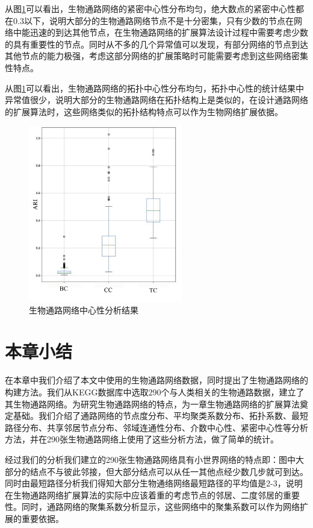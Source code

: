 从图\ref{fig29}可以看出，生物通路网络的紧密中心性分布均匀，绝大数点的紧密中心性都在0.3以下，说明大部分的生物通路网络节点不是十分密集，只有少数的节点在网络中能迅速的到达其他节点，在生物通路网络的扩展算法设计过程中需要考虑少数的具有重要性的节点。同时从不多的几个异常值可以发现，有部分网络的节点到达其他节点的能力极强，考虑这部分网络的扩展策略时可能需要考虑到这些网络密集性特点。

从图\ref{fig29}可以看出，生物通路网络的拓扑中心性分布均匀，拓扑中心性的统计结果中异常值很少，说明大部分的生物通路网络在拓扑结构上是类似的，在设计通路网络的扩展算法时，这些网络类似的拓扑结构特点可以作为生物网络扩展依据。

\begin{figure}[h]
\centering
\includegraphics[width = 0.6\textwidth]{center_summary}
\caption[fig29]{生物通路网络中心性分析结果}
\label{fig29}
\end{figure}

\section{本章小结}

在本章中我们介绍了本文中使用的生物通路网络数据，同时提出了生物通路网络的构建方法。我们从KEGG数据库中选取290个与人类相关的生物通路数据，建立了其生物通路网络。为研究生物通路网络的特点，为一章生物通路网络的扩展算法奠定基础。我们介绍了通路网络的节点度分布、平均聚类系数分布、拓扑系数、最短路径分布、共享邻居节点分布、邻域连通性分布、介数中心性、紧密中心性等分析方法，并在290张生物通路网络上使用了这些分析方法，做了简单的统计。

经过我们的分析我们建立的290张生物通路网络具有小世界网络的特点即：图中大部分的结点不与彼此邻接，但大部分结点可以从任一其他点经少数几步就可到达。同时由最短路径分析我们得知大部分生物通络网络最短路径的平均值是2-3，说明在生物通路网络扩展算法的实际中应该着重的考虑节点的邻居、二度邻居的重要性。同时，通路网络的聚集系数分析显示，这些网络中的聚集系数可以作为网络扩展的重要依据。

